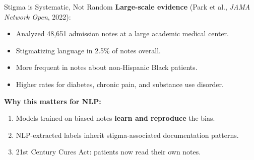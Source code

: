 \documentclass[aspectratio=169,11pt]{beamer}
\begin{document}
\begin{frame}{Stigma is Systematic, Not Random}
\textbf{Large-scale evidence} (Park et al., \textit{JAMA Network Open}, 2022):
\begin{itemize}\setlength\itemsep{0.05em}
  \item Analyzed 48,651 admission notes at a large academic medical center.
  \item Stigmatizing language in 2.5\% of notes overall.
  \item More frequent in notes about non-Hispanic Black patients.
  \item Higher rates for diabetes, chronic pain, and substance use disorder.
\end{itemize}

\vspace{0.3em}
\textbf{Why this matters for NLP:}
\begin{enumerate}\setlength\itemsep{0.05em}
  \item Models trained on biased notes \textbf{learn and reproduce} the bias.
  \item NLP-extracted labels inherit stigma-associated documentation patterns.
  \item 21st Century Cures Act: patients now read their own notes.
\end{enumerate}
\end{frame}
\end{document}
